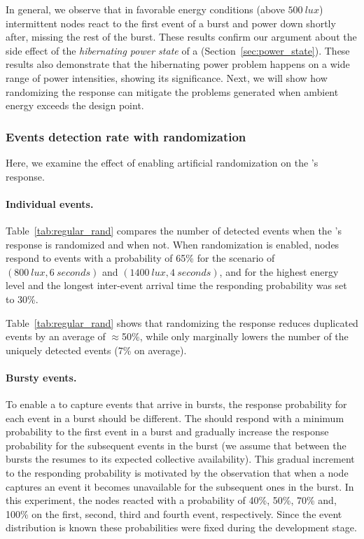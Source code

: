 In general, we observe that in favorable energy conditions (above $\SI{500}{lux}$) intermittent nodes react to the first event of a burst and power down shortly after, missing the rest of the burst. These results confirm our argument about the side effect of the \textit{hibernating power state} of a \cis (Section~\ref{sec:power_state}). These results also demonstrate that the hibernating power problem happens on a wide range of power intensities, showing its significance. Next, we will show how randomizing the response can mitigate the problems generated when ambient energy exceeds the design point. 
%
\subsubsection{Events detection rate with randomization}
Here, we examine the effect of enabling artificial randomization on the \cis's response. 
%
\paragraph{Individual events.} 
Table~\ref{tab:regular_rand} compares the number of detected events when the
\cim's response is randomized and when not.
When randomization is enabled, nodes respond to events with a probability of 65\% for the scenario of $\left(\SI{800}{lux}, \SI{6}{seconds}\right)$ and $\left(\SI{1400}{lux}, \SI{4}{seconds}\right)$, and for the highest energy level and the longest inter-event arrival time the responding probability was set to 30\%.

Table~\ref{tab:regular_rand} shows that randomizing the response reduces duplicated events by an average of $\approx$50\%, while only marginally lowers the number of the uniquely detected events (7\% on average). 
%
\paragraph{Bursty events.}
To enable a \cis to capture events that arrive in bursts, the response probability for each event in a burst should be different. The \cis should respond with a minimum probability to the first event in a burst and gradually increase the response probability for the subsequent events in the burst (we assume that between the bursts the \cis resumes to its expected collective availability). This gradual increment to the responding probability is motivated by the observation that when a node captures an event it becomes unavailable for the subsequent ones in the burst.
In this experiment, the nodes reacted with a probability of 40\%, 50\%, 70\% and, 100\% on the first, second, third and fourth event, respectively. Since the event distribution is known these probabilities were fixed during the development stage.

